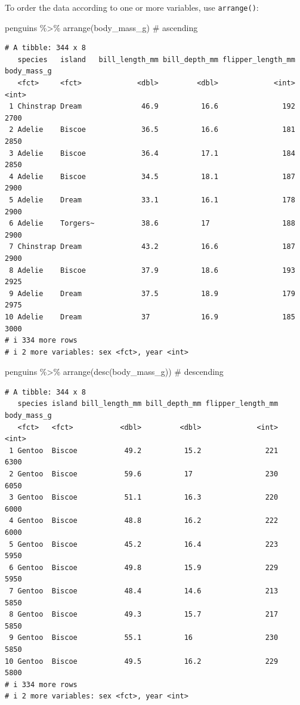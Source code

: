 \documentclass[
  letterpaper,
  DIV=11,
  numbers=noendperiod]{scrreprt}
\newenvironment{Shaded}{\begin{snugshade}}{\end{snugshade}}
\newcommand{\CommentTok}[1]{\textcolor[rgb]{0.37,0.37,0.37}{#1}}
\newcommand{\FunctionTok}[1]{\textcolor[rgb]{0.28,0.35,0.67}{#1}}
\newcommand{\NormalTok}[1]{\textcolor[rgb]{0.00,0.23,0.31}{#1}}
\newcommand{\SpecialCharTok}[1]{\textcolor[rgb]{0.37,0.37,0.37}{#1}}
\begin{document}
To order the data according to one or more variables, use
\texttt{arrange()}:

\begin{Shaded}
\begin{Highlighting}[]
\NormalTok{penguins }\SpecialCharTok{\%\textgreater{}\%} 
  \FunctionTok{arrange}\NormalTok{(body\_mass\_g) }\CommentTok{\# ascending}
\end{Highlighting}
\end{Shaded}

\begin{verbatim}
# A tibble: 344 x 8
   species   island   bill_length_mm bill_depth_mm flipper_length_mm body_mass_g
   <fct>     <fct>             <dbl>         <dbl>             <int>       <int>
 1 Chinstrap Dream              46.9          16.6               192        2700
 2 Adelie    Biscoe             36.5          16.6               181        2850
 3 Adelie    Biscoe             36.4          17.1               184        2850
 4 Adelie    Biscoe             34.5          18.1               187        2900
 5 Adelie    Dream              33.1          16.1               178        2900
 6 Adelie    Torgers~           38.6          17                 188        2900
 7 Chinstrap Dream              43.2          16.6               187        2900
 8 Adelie    Biscoe             37.9          18.6               193        2925
 9 Adelie    Dream              37.5          18.9               179        2975
10 Adelie    Dream              37            16.9               185        3000
# i 334 more rows
# i 2 more variables: sex <fct>, year <int>
\end{verbatim}

\begin{Shaded}
\begin{Highlighting}[]
\NormalTok{penguins }\SpecialCharTok{\%\textgreater{}\%} 
  \FunctionTok{arrange}\NormalTok{(}\FunctionTok{desc}\NormalTok{(body\_mass\_g)) }\CommentTok{\# descending}
\end{Highlighting}
\end{Shaded}

\begin{verbatim}
# A tibble: 344 x 8
   species island bill_length_mm bill_depth_mm flipper_length_mm body_mass_g
   <fct>   <fct>           <dbl>         <dbl>             <int>       <int>
 1 Gentoo  Biscoe           49.2          15.2               221        6300
 2 Gentoo  Biscoe           59.6          17                 230        6050
 3 Gentoo  Biscoe           51.1          16.3               220        6000
 4 Gentoo  Biscoe           48.8          16.2               222        6000
 5 Gentoo  Biscoe           45.2          16.4               223        5950
 6 Gentoo  Biscoe           49.8          15.9               229        5950
 7 Gentoo  Biscoe           48.4          14.6               213        5850
 8 Gentoo  Biscoe           49.3          15.7               217        5850
 9 Gentoo  Biscoe           55.1          16                 230        5850
10 Gentoo  Biscoe           49.5          16.2               229        5800
# i 334 more rows
# i 2 more variables: sex <fct>, year <int>
\end{verbatim}
\end{document}
